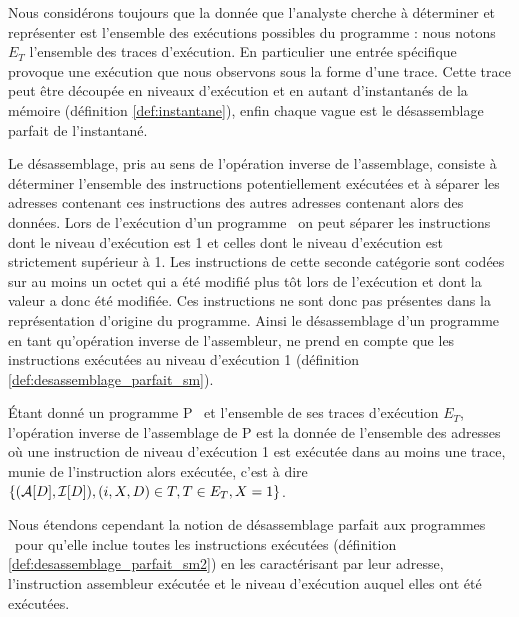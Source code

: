 Nous considérons toujours que la donnée que l'analyste cherche à déterminer et représenter est l'ensemble des exécutions possibles du programme : nous notons $E_T$ l'ensemble des traces d'exécution.
En particulier une entrée spécifique provoque une exécution que nous observons sous la forme d'une trace.
Cette trace peut être découpée en niveaux d'exécution et en autant d'instantanés de la mémoire (définition \ref{def:instantane}), enfin chaque vague est le désassemblage parfait de l'instantané.

Le désassemblage, pris au sens de l'opération inverse de l'assemblage, consiste à déterminer l'ensemble des instructions potentiellement exécutées et à séparer les adresses contenant ces instructions des autres adresses contenant alors des données.
Lors de l'exécution d'un programme \sm\ on peut séparer les instructions dont le niveau d'exécution est 1 et celles dont le niveau d'exécution est strictement supérieur à 1.
Les instructions de cette seconde catégorie sont codées sur au moins un octet qui a été modifié plus tôt lors de l'exécution et dont la valeur a donc été modifiée. Ces instructions ne sont donc pas présentes dans la représentation d'origine du programme.
Ainsi le désassemblage d'un programme \sm\, en tant qu'opération inverse de l'assembleur, ne prend en compte que les instructions exécutées au niveau d'exécution 1 (définition \ref{def:desassemblage_parfait_sm}).
\begin{defi}
 Étant donné un programme P \sm\ et l'ensemble de ses traces d'exécution
$E_T$, l'opération inverse de l'assemblage de P est la donnée de l'ensemble des adresses où une
instruction de niveau d'exécution 1 est exécutée dans au moins une
trace, munie de l'instruction alors exécutée, c'est à dire~$\{(\mathcal A[D], \mathcal I[D]), (i, X, D)\in T, T\in E_T, X=1\}$.
\label{def:desassemblage_parfait_sm}
\end{defi}

Nous étendons cependant la notion de désassemblage parfait aux programmes \sms\ pour qu'elle inclue toutes les instructions exécutées (définition \ref{def:desassemblage_parfait_sm2}) en les caractérisant par leur adresse, l'instruction assembleur exécutée et le niveau d'exécution auquel elles ont été exécutées.

